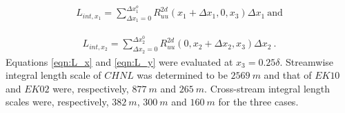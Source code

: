 \documentclass{amsart}
\begin{document}
\begin{align}
L_{int,x_1}=\sum_{\Delta x_1=0}^{\Delta x_1^{o}}R_{uu}^{2d}(x_1+\Delta x_1, 0,x_3)\Delta x_1 \ \text{and}
\label{eqn:L_x}
\end{align}

\begin{align}
L_{int,x_2}=\sum_{\Delta x_2 = 0}^{\Delta x_2^{0}}R_{uu}^{2d}(0, x_2+\Delta x_2,x_3)\Delta x_2\ .
\label{eqn:L_y}
\end{align}
Equations \ref{eqn:L_x} and \ref{eqn:L_y} were evaluated at $x_3=0.25\delta$. Streamwise integral length scale of $CHNL$ was determined  to be $2569\ m$ and that of $EK10$ and $EK02$ were, respectively, $877\ m$ and $265\ m$. Cross-stream integral length scales were, respectively, $382\ m$, $300\ m$ and $160\ m$ for the three cases. 
\end{document}
